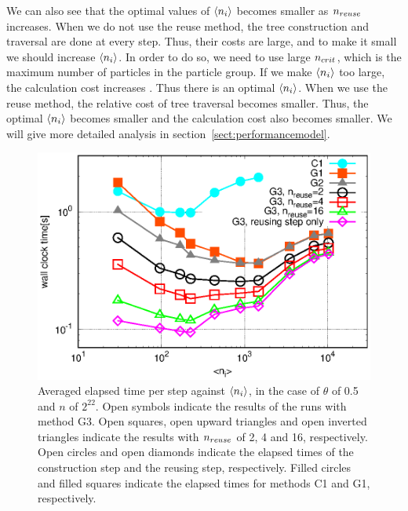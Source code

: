 \documentclass[dvipdfmx]{pasj01}
\begin{document}
We can also see that the optimal values of $\langle n_{\rm i} \rangle$
becomes smaller as $n_{\rm reuse}$ increases. When we do not use the
reuse method, the tree construction and traversal are done at every
step. Thus, their costs are large, and to make it small we should
increase $\langle n_{\rm i} \rangle$. In order to do so, we need to
use large $n_{\rm crit}$, which is the maximum number of particles in
the particle group. If we make $\langle n_{\rm i} \rangle$ too large,
the calculation cost increases \citep{1991PASJ...43..621M}. Thus there
is an optimal $\langle n_{\rm i} \rangle$. When we use the reuse
method, the relative cost of tree traversal becomes smaller. Thus, the
optimal $\langle n_{\rm i} \rangle$ becomes smaller and the
calculation cost also becomes smaller. We will give more detailed
analysis in section~\ref{sect:performancemodel}.

\begin{figure}
    \begin{center}
      \includegraphics[width=12cm]{./fig/wtime_ngrp_th0.5.eps}
    \end{center}
    \caption{Averaged elapsed time per step against $ \langle n_{\rm
        i} \rangle $, in the case of $\theta$ of 0.5 and $n$ of
      $2^{22}$. Open symbols indicate the results of the runs with
      method G3. Open squares, open upward triangles and open inverted
      triangles indicate the results with $n_{\rm reuse}$ of 2, 4 and
      16, respectively. Open circles and open diamonds indicate the
      elapsed times of the construction step and the reusing step,
      respectively. Filled circles and filled squares indicate the
      elapsed times for methods C1 and G1, respectively.  }
  \label{fig:wtime_ngrp_th0.5}
\end{figure}
\end{document}
